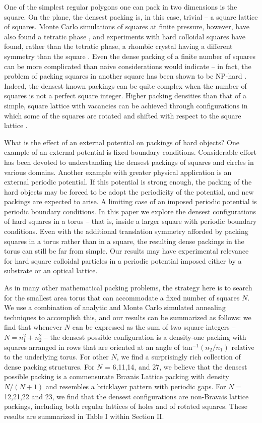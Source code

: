 \documentclass[aps]{revtex4}
\begin{document}
One of the simplest regular polygons one can pack in two dimensions is the square. On the plane, the densest packing is, in this case, trivial -- a square lattice of squares. Monte Carlo simulations of squares at finite pressure, however, have also found a tetratic phase \cite{Donev2006,Wojciechowski2004}, and experiments with hard colloidal squares have found, rather than the tetratic phase, a rhombic crystal having a different symmetry than the square \cite{Zhao2011}. Even the dense packing of a finite number of squares can be more complicated than naive considerations would indicate -- in fact, the problem of packing squares in another square has been shown to be NP-hard \cite{Leung1990}. Indeed, the densest known packings can be quite complex \cite{ERDOS1975,Friedman2002} when the number of squares is not a perfect square integer. Higher packing densities than that of a simple, square lattice with vacancies can be achieved through configurations in which some of the squares are rotated and shifted with respect to the square lattice \cite{Friedman2002}.

What is the effect of an external potential on packings of hard objects? One example of an external potential is fixed boundary conditions.  Considerable effort has been devoted to understanding the densest packings of squares and circles in various domains.  Another example with greater physical application is an external periodic potential.  If this potential is strong enough, the packing of the hard objects may be forced to be adopt the periodicity of the potential, and new packings are expected to arise.  A limiting case of an imposed periodic potential is periodic boundary conditions.  In this paper we explore the densest configurations of hard squares in a torus -- that is, inside a larger square with periodic boundary conditions.  Even with the additional translation symmetry afforded by packing squares in a torus rather than in a square, the resulting dense packings in the torus can still be far from simple. Our results may have experimental relevance for hard square colloidal particles in a periodic potential imposed either by a substrate or an optical lattice.

As in many other mathematical packing problems, the strategy here is to search for the smallest area torus that can accommodate a fixed number of squares $N$.  We use a combination of analytic and Monte Carlo simulated annealing techniques to accomplish this, and our results can be summarized as follows: we find that whenever $N$ can be expressed as the sum of two square integers -- $N=n_1^2+n_2^2$ -- the densest possible configuration is a density-one packing with squares arranged in rows that are oriented at an angle of tan$^{-1}(n_2/n_1)$ relative to the underlying torus.  For other $N$, we find a surprisingly rich collection of dense packing structures. For $N$ = 6,11,14, and 27, we believe that the densest possible packing is a commensurate Bravais Lattice packing with density $N/(N+1)$ and resembles a bricklayer pattern with periodic gaps.  For $N=$ 12,21,22 and 23, we find that the densest configurations are non-Bravais lattice packings, including both regular lattices of holes and of rotated squares. These results are summarized in Table I within Section II.
\end{document}
